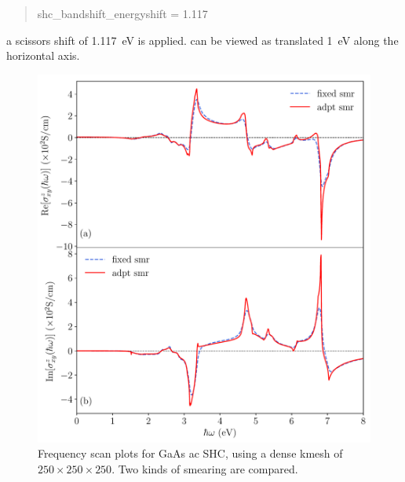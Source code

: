 \begin{itemize}
{\begin{quote}
		shc\_bandshift\_energyshift = 1.117
\end{quote} }
a scissors shift of 1.117~eV is applied. 
 can be viewed as  translated 
1~eV along the horizontal axis. 
\begin{figure}[!htb]
\centering
\includegraphics[width=0.8\columnwidth]{figure/example30/gaas_freqscan.pdf}
\caption{Frequency scan plots for GaAs ac SHC, using 
	a dense kmesh of $250\times250\times250$. 
Two kinds of smearing are compared.}
\label{fig30.2}
\end{figure}
\end{itemize}